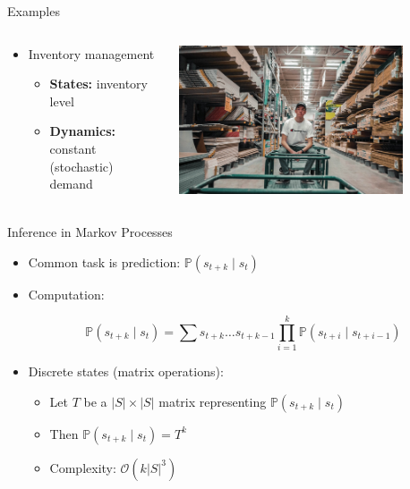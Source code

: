 \documentclass[11pt,table]{beamer}
\begin{document}
\begin{frame}{Examples}
 \begin{columns}[T]
\begin{column}{0.5\textwidth}
\begin{itemize}
    \item  Inventory management

\begin{itemize}
\item  \textbf{States:} inventory level

\item \textbf{Dynamics:} constant (stochastic) demand

\end{itemize}

\end{itemize}
\end{column}
\begin{column}{0.45\textwidth}
\centering
\includegraphics[width=0.8\textwidth]{figures/16.png}
\end{column}
\end{columns}

\end{frame}


\begin{frame}{Inference in Markov Processes}

\begin{itemize}
    \item  Common task is prediction: $\mathbb{P}\left(s_{t+k} \mid s_{t}\right)$


\item  Computation:


$$
\mathbb{P}\left(s_{t+k} \mid s_{t}\right)=\sum s_{t+k} \ldots s_{t+k-1} \prod_{i=1}^{k} \mathbb{P}\left(s_{t+i} \mid s_{t+i-1}\right)
$$

\item Discrete states (matrix operations):
\begin{itemize}
\item  Let $T$ be a $|S| \times|S|$ matrix representing $\mathbb{P}\left(s_{t+k} \mid s_{t}\right)$\\[2ex]
\item  Then $\mathbb{P}\left(s_{t+k} \mid s_{t}\right)=T^{k}$\\[2ex]
\item  Complexity: $\mathcal{O}\left(k|S|^{3}\right)$ 
\end{itemize}
\end{itemize}
    
\end{frame}
\end{document}
